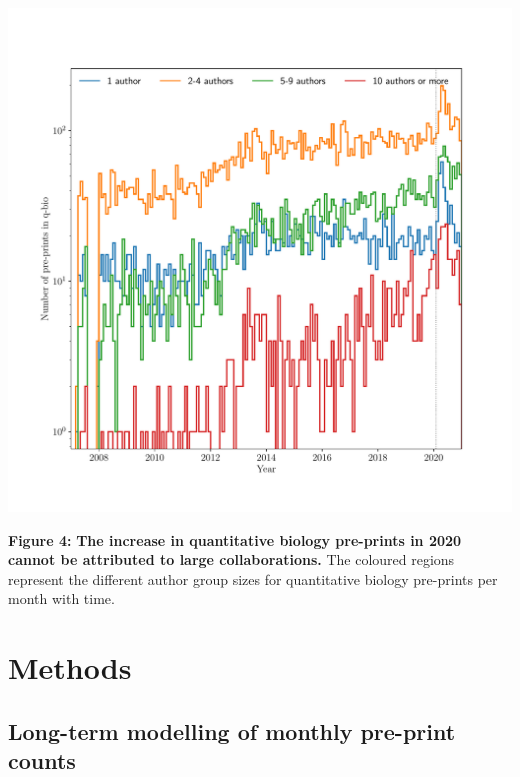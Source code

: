 \documentclass[a4paper,12pt]{article}
\begin{document}
\begin{center}
     \includegraphics[width=\linewidth]{q-bio-pre-prints-segmented-by-author-count}
\end{center}

\noindent \textbf{Figure 4:} \textbf{The increase in quantitative biology pre-prints in 2020 cannot be attributed to large collaborations.} The coloured regions represent the different author group sizes for quantitative biology pre-prints per month with time.


\newpage




\newpage
\section*{Methods}


\subsection*{Long-term modelling of monthly pre-print counts}
\end{document}
